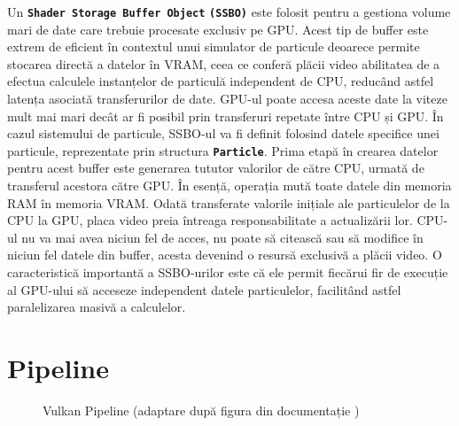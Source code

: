 Un \textbf{\texttt{Shader Storage Buffer Object}} \textbf{\texttt{(SSBO)}} este folosit pentru a gestiona volume mari de date care trebuie procesate exclusiv pe GPU. Acest tip de buffer este extrem de eficient în contextul unui simulator de particule deoarece permite stocarea directă a datelor în VRAM, ceea ce conferă plăcii video abilitatea de a efectua calculele instanțelor de particulă independent de CPU, reducând astfel latența asociată transferurilor de date. GPU-ul poate accesa aceste date la viteze mult mai mari decât ar fi posibil prin transferuri repetate între CPU și GPU. În cazul sistemului de particule, SSBO-ul va fi definit folosind datele specifice unei particule, reprezentate prin structura \textbf{\texttt{Particle}}. Prima etapă în crearea datelor pentru acest buffer este generarea tututor valorilor de către CPU, urmată de transferul acestora către GPU. În esență, operația mută toate datele din memoria RAM în memoria VRAM. Odată transferate valorile inițiale ale particulelor de la CPU la GPU, placa video preia întreaga responsabilitate a actualizării lor. CPU-ul nu va mai avea niciun fel de acces, nu poate să citească sau să modifice în niciun fel datele din buffer, acesta devenind o resursă exclusivă a plăcii video. O caracteristică importantă a SSBO-urilor este că ele permit fiecărui fir de execuție al GPU-ului să acceseze independent datele particulelor, facilitând astfel paralelizarea masivă a calculelor. 

\section{Pipeline}
\begin{figure}[ht]
    \centering
    
    \caption{Vulkan Pipeline (adaptare după figura din documentație \cite{VulkanPipeline_citation})}
    \label{fig:vulkan-pipeline}
\end{figure}

